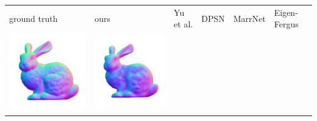 \begin{tabularx}{\linewidth}{@{}Y@{}Y@{}Y@{}Y@{}Y@{}Y@{}}
ground truth & ours & Yu et al. & DPSN & MarrNet & Eigen-Fergus \\
\includegraphics[width=\linewidth]{semisynthetic/20150514_14_gt.png} &
\includegraphics[width=\linewidth]{semisynthetic/20150514_14_ours_out.png} &

\end{tabularx}
